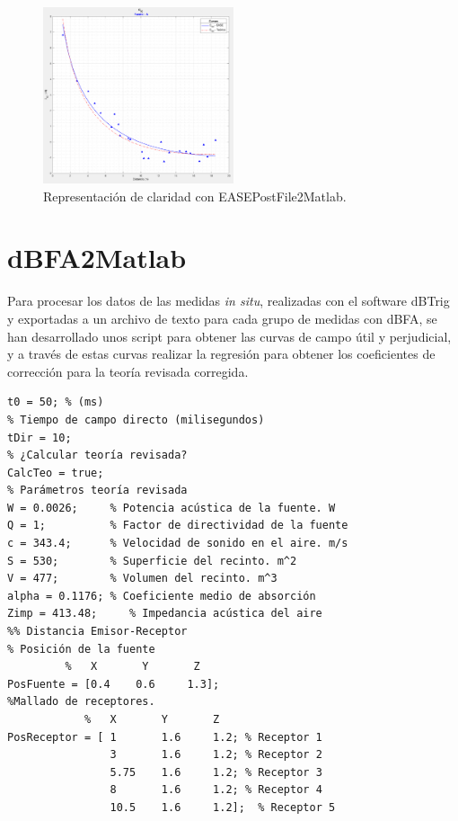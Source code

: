 \begin{description}
	\begin{figure}[ht]
    \centering
    \includegraphics[width=0.5\textwidth]{archivos/capturas/claridadease}
    \caption{Representación de claridad con EASEPostFile2Matlab.}
\end{figure}
\FloatBarrier
	
\end{description}

 
\section{dBFA2Matlab}

Para procesar los datos de las medidas \textit{in situ}, realizadas con el software dBTrig y exportadas a un archivo de texto para cada grupo de medidas con dBFA, se han desarrollado unos script para obtener las curvas de campo útil y perjudicial, y a través de estas curvas realizar la regresión para obtener los coeficientes de corrección para la teoría revisada corregida.

\begin{lstlisting}[style=Matlab-color,numbers=none, caption={Líneas de código Matlab para introducir párametros para el archivo con medidas de dBFA.},label=dBFAmatlab]
% Valor a analizar '0 a Val' (campo útil) y 'Val a infinito' (perjudicial)
t0 = 50; % (ms)
% Tiempo de campo directo (milisegundos)
tDir = 10;
% ¿Calcular teoría revisada?
CalcTeo = true;
% Parámetros teoría revisada
W = 0.0026;     % Potencia acústica de la fuente. W
Q = 1;          % Factor de directividad de la fuente
c = 343.4;      % Velocidad de sonido en el aire. m/s
S = 530;        % Superficie del recinto. m^2
V = 477;        % Volumen del recinto. m^3
alpha = 0.1176; % Coeficiente medio de absorción
Zimp = 413.48;     % Impedancia acústica del aire
%% Distancia Emisor-Receptor
% Posición de la fuente
         %   X       Y       Z
PosFuente = [0.4    0.6     1.3];
%Mallado de receptores.
            %   X       Y       Z
PosReceptor = [ 1       1.6     1.2; % Receptor 1
                3       1.6     1.2; % Receptor 2
                5.75    1.6     1.2; % Receptor 3
                8       1.6     1.2; % Receptor 4
                10.5	1.6     1.2];  % Receptor 5      
\end{lstlisting}


